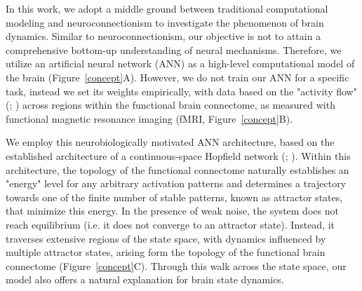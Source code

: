 \documentclass{article}
\begin{document}
In this work, we adopt a middle ground between traditional computational modeling and neuroconnectionism to investigate
the phenomenon of brain dynamics.
Similar to neuroconnectionism, our objective is not to attain a comprehensive bottom-up understanding of neural
mechanisms. Therefore, we utilize an artificial neural network (ANN) as a high-level computational model of the
brain (Figure~\ref{concept}A).
However, we do not train our ANN for a specific task, instead we set its weights empirically, with data based
on the "activity flow" (\href{https://doi.org/10.1038/nn.4406}{}; \href{https://doi.org/10.1038/s41467-017-01000-w}{})
across regions within the functional brain connectome, as measured with functional magnetic resonance imaging
(fMRI, Figure~\ref{concept}B).

We employ this neurobiologically motivated ANN architecture, based on the established architecture of a continuous-space
Hopfield network (\href{https://doi.org/10.1073/pnas.79.8.2554}{}; \href{https://doi.org/10.1038/s42254-023-00595-y}{}).
Within this architecture, the topology of the functional connectome naturally establishes an "energy" level for any
arbitrary activation patterns and determines a trajectory towards one of the finite number of stable patterns, known as
attractor states, that minimize this energy.
In the presence of weak noise, the system does not reach equilibrium (i.e. it does not converge to an attractor state).
Instead, it traverses extensive regions of the state space, with dynamics influenced by multiple attractor states,
arising form the topology of the functional brain connectome (Figure~\ref{concept}C).
Through this walk across the state space, our model also offers a natural explanation for brain state dynamics.
\end{document}

